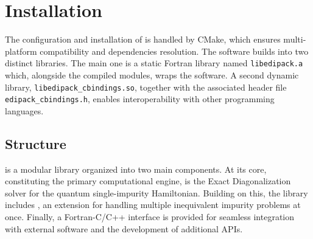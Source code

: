 \documentclass[edipack_sp.tex]{subfiles}
\begin{document}

\section{Installation}\label{SecInstall}
The configuration and installation of \NAME is handled by CMake, which ensures
multi-platform compatibility and dependencies resolution.  
The software builds into two distinct libraries.
The main one is a static Fortran library named {\tt libedipack.a} which, alongside the compiled
modules, wraps the \NAME software.
A second dynamic library, {\tt libedipack\_cbindings.so}, together with the associated header
file {\tt edipack\_cbindings.h}, enables interoperability with other programming languages.  


\subsection{Structure}\label{sSecInstallStructure}
\NAME is a modular library organized into two main components. At its 
core, constituting the primary computational engine, 
is the  Exact Diagonalization solver for the quantum single-impurity Hamiltonian.
Building on this, the library includes 
, an extension for handling multiple inequivalent impurity problems at once. Finally, a Fortran-C/C++ interface is provided for 
seamless integration with external software and the development of additional APIs.
\end{document}
